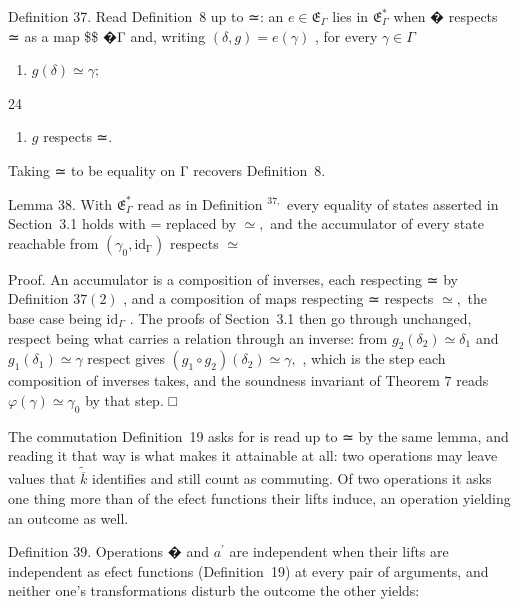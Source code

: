 \documentclass[
  10
]{article}
\providecommand{\tightlist}{%
  \setlength{\itemsep}{0pt}\setlength{\parskip}{0pt}}
\begin{document}
Definition 37. Read Definition~8 up to ≃: an
\(e \in { \mathfrak { E } } _ { \Gamma }\) lies in
\({ \mathfrak { E } } _ { \Gamma } ^ { * }\) when � respects ≃ as a map
\$\Gamma \$ �Γ and, writing \(( \delta , g ) = e ( \gamma )\) , for
every \(\gamma \in \Gamma\)

\begin{enumerate}
\def\labelenumi{\arabic{enumi}.}
\tightlist
\item
  \(g ( \delta ) \simeq \gamma ;\)
\end{enumerate}

24

\begin{enumerate}
\def\labelenumi{\arabic{enumi}.}
\setcounter{enumi}{1}
\tightlist
\item
  \(g\) respects ≃.
\end{enumerate}

Taking ≃ to be equality on Γ recovers Definition~8.

Lemma 38. With \({ \mathfrak { E } } _ { \Gamma } ^ { * }\) read as in
Definition \(^ { 3 7 , }\) every equality of states asserted in
Section~3.1 holds with = replaced by \(\simeq ,\) and the accumulator of
every state reachable from
\(( \gamma _ { 0 } , \mathrm { i d _ { \Gamma } } )\) respects
\(\simeq\)

Proof. An accumulator is a composition of inverses, each respecting ≃ by
Definition \(3 7 ( 2 )\) , and a composition of maps respecting ≃
respects \(\simeq ,\) the base case being
\(\mathrm { i d } _ { \Gamma }\) . The proofs of Section~3.1 then go
through unchanged, respect being what carries a relation through an
inverse: from \(g _ { 2 } ( \delta _ { 2 } ) \simeq \delta _ { 1 }\) and
\(g _ { 1 } ( \delta _ { 1 } ) \simeq \gamma\) respect gives
\(( g _ { 1 } \circ g _ { 2 } ) ( \delta _ { 2 } ) \simeq \gamma ,\) ,
which is the step each composition of inverses takes, and the soundness
invariant of Theorem \(7\) reads
\(\varphi ( \gamma ) \simeq \gamma _ { 0 }\) by that step. □

The commutation Definition~19 asks for is read up to ≃ by the same
lemma, and reading it that way is what makes it attainable at all: two
operations may leave values that \(\widetilde { \overline { { k } } }\)
identifies and still count as commuting. Of two operations it asks one
thing more than of the efect functions their lifts induce, an operation
yielding an outcome as well.

Definition 39. Operations � and \(a ^ { \prime }\) are independent when
their lifts are independent as efect functions (Definition~19) at every
pair of arguments, and neither one's transformations disturb the outcome
the other yields:
\end{document}
